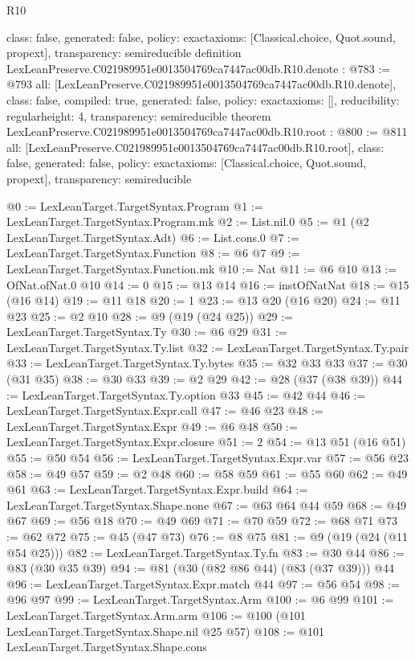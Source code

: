 \begin{lexlean}{R10}
\begin{coremodule}
{  class: false,
  generated: false,
  policy: exact{axioms: [Classical.choice, Quot.sound, propext]},
  transparency: semireducible
}
definition LexLeanPreserve.C021989951e0013504769ca7447ac00db.R10.denote : @783 := @793 {
  all: [LexLeanPreserve.C021989951e0013504769ca7447ac00db.R10.denote],
  class: false,
  compiled: true,
  generated: false,
  policy: exact{axioms: []},
  reducibility: regular{height: 4},
  transparency: semireducible
}
theorem LexLeanPreserve.C021989951e0013504769ca7447ac00db.R10.root : @800 := @811 {
  all: [LexLeanPreserve.C021989951e0013504769ca7447ac00db.R10.root],
  class: false,
  generated: false,
  policy: exact{axioms: [Classical.choice, Quot.sound, propext]},
  transparency: semireducible
}

@0 := LexLeanTarget.TargetSyntax.Program
@1 := LexLeanTarget.TargetSyntax.Program.mk
@2 := List.nil.{0}
@5 := @1 (@2 LexLeanTarget.TargetSyntax.Adt)
@6 := List.cons.{0}
@7 := LexLeanTarget.TargetSyntax.Function
@8 := @6 @7
@9 := LexLeanTarget.TargetSyntax.Function.mk
@10 := Nat
@11 := @6 @10
@13 := OfNat.ofNat.{0} @10
@14 := 0
@15 := @13 @14
@16 := instOfNatNat
@18 := @15 (@16 @14)
@19 := @11 @18
@20 := 1
@23 := @13 @20 (@16 @20)
@24 := @11 @23
@25 := @2 @10
@28 := @9 (@19 (@24 @25))
@29 := LexLeanTarget.TargetSyntax.Ty
@30 := @6 @29
@31 := LexLeanTarget.TargetSyntax.Ty.list
@32 := LexLeanTarget.TargetSyntax.Ty.pair
@33 := LexLeanTarget.TargetSyntax.Ty.bytes
@35 := @32 @33 @33
@37 := @30 (@31 @35)
@38 := @30 @33
@39 := @2 @29
@42 := @28 (@37 (@38 @39))
@44 := LexLeanTarget.TargetSyntax.Ty.option @33
@45 := @42 @44
@46 := LexLeanTarget.TargetSyntax.Expr.call
@47 := @46 @23
@48 := LexLeanTarget.TargetSyntax.Expr
@49 := @6 @48
@50 := LexLeanTarget.TargetSyntax.Expr.closure
@51 := 2
@54 := @13 @51 (@16 @51)
@55 := @50 @54
@56 := LexLeanTarget.TargetSyntax.Expr.var
@57 := @56 @23
@58 := @49 @57
@59 := @2 @48
@60 := @58 @59
@61 := @55 @60
@62 := @49 @61
@63 := LexLeanTarget.TargetSyntax.Expr.build
@64 := LexLeanTarget.TargetSyntax.Shape.none
@67 := @63 @64 @44 @59
@68 := @49 @67
@69 := @56 @18
@70 := @49 @69
@71 := @70 @59
@72 := @68 @71
@73 := @62 @72
@75 := @45 (@47 @73)
@76 := @8 @75
@81 := @9 (@19 (@24 (@11 @54 @25)))
@82 := LexLeanTarget.TargetSyntax.Ty.fn
@83 := @30 @44
@86 := @83 (@30 @35 @39)
@94 := @81 (@30 (@82 @86 @44) (@83 (@37 @39))) @44
@96 := LexLeanTarget.TargetSyntax.Expr.match @44
@97 := @56 @54
@98 := @96 @97
@99 := LexLeanTarget.TargetSyntax.Arm
@100 := @6 @99
@101 := LexLeanTarget.TargetSyntax.Arm.arm
@106 := @100 (@101 LexLeanTarget.TargetSyntax.Shape.nil @25 @57)
@108 := @101 LexLeanTarget.TargetSyntax.Shape.cons

\end{coremodule}
\end{lexlean}
